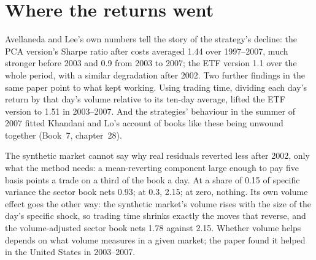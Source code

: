 \begin{omfigure}

\label{fig:s1:residual-and-principal-component-stat-arb:stab}
\end{omfigure}

\section{Where the returns went}

Avellaneda and Lee's own numbers tell the story of the strategy's decline: the PCA version's Sharpe ratio after costs averaged 1.44 over 1997--2007, much
stronger before 2003 and 0.9 from 2003 to 2007; the ETF version 1.1 over the whole period, with a similar degradation after 2002. Two further findings in the
same paper point to what kept working. Using trading time, dividing each day's return by that day's volume relative to its ten-day average, lifted the ETF
version to 1.51 in 2003--2007. And the strategies' behaviour in the summer of 2007 fitted Khandani and Lo's account of books like these being unwound together
(Book~7, chapter~28).

The synthetic market cannot say why real residuals reverted less after 2002, only what the method needs: a mean-reverting component large enough to pay
five basis points a trade on a third of the book a day. At a share of 0.15 of specific variance the sector book nets 0.93; at 0.3, 2.15; at zero, nothing.
Its own volume effect goes the other way: the synthetic market's volume rises with the size of the day's specific shock, so trading time shrinks exactly the
moves that reverse, and the volume-adjusted sector book nets 1.78 against 2.15. Whether volume helps depends on what volume measures in a given market; the
paper found it helped in the United States in 2003--2007.

